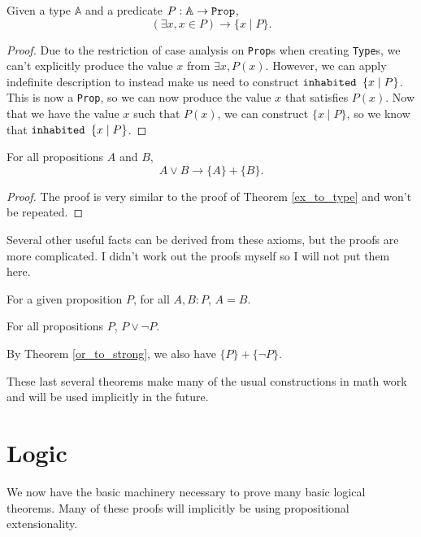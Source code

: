\documentclass[../../math.tex]{subfiles}
\begin{document}
\begin{theorem} \label{ex_to_type}
    Given a type $\mathbb A$ and a predicate $P : \mathbb A \rightarrow
    \verb|Prop|$,
    \[
        (\exists x, x \in P) \rightarrow \{x \mid P\}.
    \]
\end{theorem}
\begin{proof}
    Due to the restriction of case analysis on \verb|Prop|s when creating
    \verb|Type|s, we can't explicitly produce the value $x$ from $\exists x,
    P(x)$.  However, we can apply indefinite description to instead make us
    need to construct $\verb|inhabited | \{x \mid P\}$.  This is now a
    \verb|Prop|, so we can now produce the value $x$ that satisfies $P(x)$.  Now
    that we have the value $x$ such that $P(x)$, we can construct $\{x \mid
    P\}$, so we know that $\verb|inhabited | \{x \mid P\}$.
\end{proof}

\begin{theorem} \label{or_to_strong}
    For all propositions $A$ and $B$,
    \[
        A \vee B \rightarrow \{A\} + \{B\}.
    \]
\end{theorem}
\begin{proof}
    The proof is very similar to the proof of Theorem \ref{ex_to_type} and won't
    be repeated.
\end{proof}

Several other useful facts can be derived from these axioms, but the proofs are
more complicated.  I didn't work out the proofs myself so I will not put them
here.

\begin{theorem}
    For a given proposition $P$, for all $A, B : P$, $A = B$.
\end{theorem}

\begin{theorem}
    For all propositions $P$, $P \vee \neg P$.
\end{theorem}
\noindent By Theorem \ref{or_to_strong}, we also have $\{P\} + \{\neg P\}$.

These last several theorems make many of the usual constructions in math work
and will be used implicitly in the future.

\section{Logic}

We now have the basic machinery necessary to prove many basic logical theorems.
Many of these proofs will implicitly be using propositional extensionality.
\end{document}
